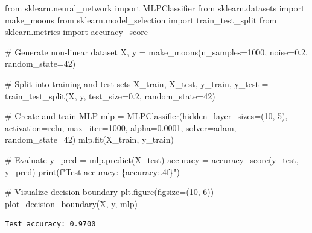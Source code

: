 \documentclass[
  letterpaper,
  DIV=11,
  numbers=noendperiod]{scrreprt}
\newenvironment{Shaded}{\begin{snugshade}}{\end{snugshade}}
\newcommand{\BuiltInTok}[1]{\textcolor[rgb]{0.00,0.23,0.31}{#1}}
\newcommand{\CommentTok}[1]{\textcolor[rgb]{0.37,0.37,0.37}{#1}}
\newcommand{\DecValTok}[1]{\textcolor[rgb]{0.68,0.00,0.00}{#1}}
\newcommand{\FloatTok}[1]{\textcolor[rgb]{0.68,0.00,0.00}{#1}}
\newcommand{\ImportTok}[1]{\textcolor[rgb]{0.00,0.46,0.62}{#1}}
\newcommand{\NormalTok}[1]{\textcolor[rgb]{0.00,0.23,0.31}{#1}}
\newcommand{\OperatorTok}[1]{\textcolor[rgb]{0.37,0.37,0.37}{#1}}
\newcommand{\SpecialCharTok}[1]{\textcolor[rgb]{0.37,0.37,0.37}{#1}}
\newcommand{\SpecialStringTok}[1]{\textcolor[rgb]{0.13,0.47,0.30}{#1}}
\newcommand{\StringTok}[1]{\textcolor[rgb]{0.13,0.47,0.30}{#1}}
\begin{document}
\begin{Shaded}
\begin{Highlighting}[]
\ImportTok{from}\NormalTok{ sklearn.neural\_network }\ImportTok{import}\NormalTok{ MLPClassifier}
\ImportTok{from}\NormalTok{ sklearn.datasets }\ImportTok{import}\NormalTok{ make\_moons}
\ImportTok{from}\NormalTok{ sklearn.model\_selection }\ImportTok{import}\NormalTok{ train\_test\_split}
\ImportTok{from}\NormalTok{ sklearn.metrics }\ImportTok{import}\NormalTok{ accuracy\_score}

\CommentTok{\# Generate non{-}linear dataset}
\NormalTok{X, y }\OperatorTok{=}\NormalTok{ make\_moons(n\_samples}\OperatorTok{=}\DecValTok{1000}\NormalTok{, noise}\OperatorTok{=}\FloatTok{0.2}\NormalTok{, random\_state}\OperatorTok{=}\DecValTok{42}\NormalTok{)}

\CommentTok{\# Split into training and test sets}
\NormalTok{X\_train, X\_test, y\_train, y\_test }\OperatorTok{=}\NormalTok{ train\_test\_split(X, y, test\_size}\OperatorTok{=}\FloatTok{0.2}\NormalTok{, random\_state}\OperatorTok{=}\DecValTok{42}\NormalTok{)}

\CommentTok{\# Create and train MLP}
\NormalTok{mlp }\OperatorTok{=}\NormalTok{ MLPClassifier(hidden\_layer\_sizes}\OperatorTok{=}\NormalTok{(}\DecValTok{10}\NormalTok{, }\DecValTok{5}\NormalTok{), activation}\OperatorTok{=}\StringTok{\textquotesingle{}relu\textquotesingle{}}\NormalTok{, }
\NormalTok{                    max\_iter}\OperatorTok{=}\DecValTok{1000}\NormalTok{, alpha}\OperatorTok{=}\FloatTok{0.0001}\NormalTok{,}
\NormalTok{                    solver}\OperatorTok{=}\StringTok{\textquotesingle{}adam\textquotesingle{}}\NormalTok{, random\_state}\OperatorTok{=}\DecValTok{42}\NormalTok{)}
\NormalTok{mlp.fit(X\_train, y\_train)}

\CommentTok{\# Evaluate}
\NormalTok{y\_pred }\OperatorTok{=}\NormalTok{ mlp.predict(X\_test)}
\NormalTok{accuracy }\OperatorTok{=}\NormalTok{ accuracy\_score(y\_test, y\_pred)}
\BuiltInTok{print}\NormalTok{(}\SpecialStringTok{f"Test accuracy: }\SpecialCharTok{\{}\NormalTok{accuracy}\SpecialCharTok{:.4f\}}\SpecialStringTok{"}\NormalTok{)}

\CommentTok{\# Visualize decision boundary}
\NormalTok{plt.figure(figsize}\OperatorTok{=}\NormalTok{(}\DecValTok{10}\NormalTok{, }\DecValTok{6}\NormalTok{))}
\NormalTok{plot\_decision\_boundary(X, y, mlp)}
\end{Highlighting}
\end{Shaded}

\begin{verbatim}
Test accuracy: 0.9700
\end{verbatim}
\end{document}
